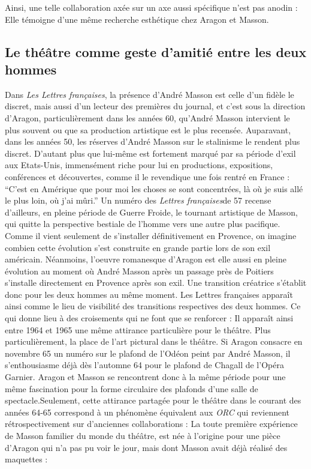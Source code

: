 	Ainsi, une telle collaboration axée sur un axe aussi spécifique n’est pas anodin : Elle témoigne d’une même recherche esthétique chez Aragon et Masson. 
\subsection{Le théâtre comme geste d'amitié entre les deux hommes}

	Dans \emph{Les Lettres françaises}, la présence d’André Masson est celle d’un fidèle le discret, mais aussi d’un lecteur des premières du journal, et c’est sous la direction d’Aragon, particulièrement dans les années 60, qu’André Masson intervient le plus souvent ou que sa production artistique est le plus recensée. Auparavant, dans les années 50, les réserves d’André Masson sur le stalinisme le rendent plus discret. D’autant plus que lui-même est fortement marqué par sa période d’exil aux Etats-Unis, immensément riche pour lui en productions, expositions, conférences et découvertes, comme il le revendique une fois rentré en France : \enquote{C’est en Amérique que pour moi les choses se sont concentrées, là où je suis allé le plus loin, où j’ai mûri.} Un numéro des \emph{Lettres françaises}de 57 recense d’ailleurs, en pleine période de Guerre Froide, le tournant artistique de Masson, qui quitte la perspective bestiale de l’homme vers une autre plus pacifique. Comme il vient seulement de s’installer définitivement en Provence, on imagine combien cette évolution s’est construite en grande partie lors de son exil américain. Néanmoins, l’oeuvre romanesque d’Aragon est elle aussi en pleine évolution au moment où André Masson après un passage près de Poitiers s’installe directement en Provence après son exil. Une transition créatrice s’établit donc pour les deux hommes au même moment. Les Lettres françaises apparaît ainsi comme le lieu de visibilité des transitions respectives des deux hommes. Ce qui donne lieu à des croisements qui ne font que se renforcer : Il apparaît ainsi entre 1964 et 1965 une même attirance particulière pour le théâtre. Plus particulièrement, la place de l’art pictural dans le théâtre. Si Aragon consacre en novembre 65 un numéro sur le plafond de l’Odéon peint par André Masson, il s’enthousiasme déjà dès l’automne 64 pour le plafond de Chagall de l’Opéra Garnier. Aragon et Masson se rencontrent donc à la même période pour une même fascination pour la forme circulaire des plafonds d’une salle de spectacle.Seulement, cette attirance partagée pour le théâtre dans le courant des années 64-65 correspond à un phénomène équivalent aux \emph{ORC} qui reviennent rétrospectivement sur d'anciennes collaborations : La toute première expérience de Masson familier du monde du théâtre, est née à l'origine pour une pièce d'Aragon qui n'a pas pu voir le jour, mais dont Masson avait déjà réalisé des maquettes : 
